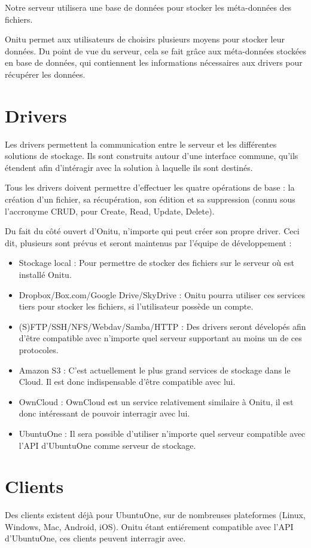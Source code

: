 Notre serveur utilisera une base de données pour stocker les méta-données des fichiers.

Onitu permet aux utilisateurs de choisirs plusieurs moyens pour stocker leur données. Du point de vue du serveur, cela se fait grâce aux méta-données stockées en base de données, qui contiennent les informations nécessaires aux drivers pour récupérer les données. 

\section{Drivers}
Les drivers permettent la communication entre le serveur et les différentes solutions de stockage. Ils sont construits autour d'une interface commune, qu'ils étendent afin d'intéragir avec la solution à laquelle ils sont destinés.

Tous les drivers doivent permettre d'effectuer les quatre opérations de base : la création d'un fichier, sa récupération, son édition et sa suppression (connu sous l'accronyme CRUD, pour Create, Read, Update, Delete).

Du fait du côté ouvert d'Onitu, n'importe qui peut créer son propre driver. Ceci dit, plusieurs sont prévus et seront maintenus par l'équipe de développement :
\begin{itemize}
    \item Stockage local : Pour permettre de stocker des fichiers sur le serveur où est installé Onitu.
    \item Dropbox/Box.com/Google Drive/SkyDrive : Onitu pourra utiliser ces services tiers pour stocker les fichiers, si l'utilisateur possède un compte.
    \item (S)FTP/SSH/NFS/Webdav/Samba/HTTP : Des drivers seront dévelopés afin d'être compatible avec n'importe quel serveur supportant au moins un de ces protocoles.
    \item Amazon S3 : C'est actuellement le plus grand services de stockage dans le Cloud. Il est donc indispensable d'être compatible avec lui.
    \item OwnCloud : OwnCloud est un service relativement similaire à Onitu, il est donc intéressant de pouvoir interragir avec lui.
    \item UbuntuOne : Il sera possible d'utiliser n'importe quel serveur compatible avec l'API d'UbuntuOne comme serveur de stockage.
\end{itemize}

\section{Clients}
Des clients existent déjà pour UbuntuOne, sur de nombreuses plateformes (Linux, Windows, Mac, Android, iOS). Onitu étant entiérement compatible avec l'API d'UbuntuOne, ces clients peuvent interragir avec.

